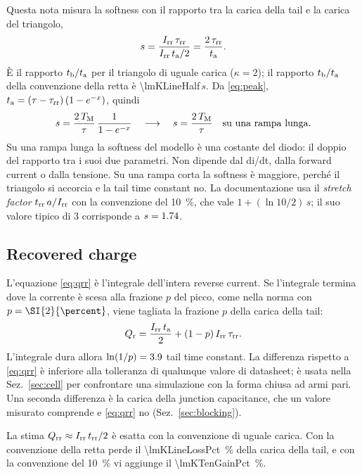 \documentclass[10pt,a4paper]{scrartcl}
\let\newcommand\lmitdefine
\newcommand{\Irr}{I_\mathrm{rr}}
\newcommand{\Qrr}{Q_\mathrm{rr}}
\newcommand{\trr}{t_\mathrm{rr}}
\newcommand{\ta}{t_\mathrm{a}}
\newcommand{\tb}{t_\mathrm{b}}
\newcommand{\taurr}{\tau_\mathrm{rr}}
\newcommand{\TM}{T_\mathrm{M}}
\begin{document}
Questa nota misura la softness con il rapporto tra la carica della tail e la carica del triangolo,
\begin{equation}
s = \frac{\Irr\,\taurr}{\Irr\,\ta/2} = \frac{2\,\taurr}{\ta} .
\label{eq:soft}
\end{equation}
È il rapporto $\tb/\ta$ per il triangolo di uguale carica ($\kappa = 2$); il rapporto $\tb/\ta$ della convenzione della retta è \num{\lmKLineHalf}\,$s$. Da \eqref{eq:peak}, $\ta = (\tau-\taurr)\,(1-e^{-x})$, quindi
\begin{equation}
s = \frac{2\,\TM}{\tau}\,\frac{1}{1-e^{-x}} \quad\longrightarrow\quad s = \frac{2\,\TM}{\tau} \quad \text{su una rampa lunga.}
\label{eq:softlong}
\end{equation}
Su una rampa lunga la softness del modello è una costante del diodo: il doppio del rapporto tra i suoi due parametri. Non dipende dal di/dt, dalla forward current o dalla tensione. Su una rampa corta la softness è maggiore, perché il triangolo si accorcia e la tail time constant no. La documentazione \cite{mathworks} usa il \emph{stretch factor} $\trr\,a/\Irr$ con la convenzione del \SI{10}{\percent}, che vale $1 + (\ln 10/2)\,s$; il suo valore tipico di 3 corrisponde a $s = 1.74$.

\subsection{Recovered charge}
L'equazione \eqref{eq:qrr} è l'integrale dell'intera reverse current. Se l'integrale termina dove la corrente è scesa alla frazione $p$ del picco, come nella norma con $p = \SI{\lmPEndPct}{\percent}$, viene tagliata la frazione $p$ della carica della tail:
\begin{equation}
Q_\mathrm{r} = \frac{\Irr\,\ta}{2} + (1-p)\,\Irr\,\taurr .
\label{eq:qrp}
\end{equation}
L'integrale dura allora $\ln(1/p) = 3.9$ tail time constant. La differenza rispetto a \eqref{eq:qrr} è inferiore alla tolleranza di qualunque valore di datasheet; è usata nella Sez.~\ref{sec:cell} per confrontare una simulazione con la forma chiusa ad armi pari. Una seconda differenza è la carica della junction capacitance, che un valore misurato comprende e \eqref{eq:qrr} no (Sez.~\ref{sec:blocking}).

La stima $\Qrr \approx \Irr\,\trr/2$ è esatta con la convenzione di uguale carica. Con la convenzione della retta perde il \SI{\lmKLineLossPct}{\percent} della carica della tail, e con la convenzione del \SI{10}{\percent} vi aggiunge il \SI{\lmKTenGainPct}{\percent}.
\end{document}
